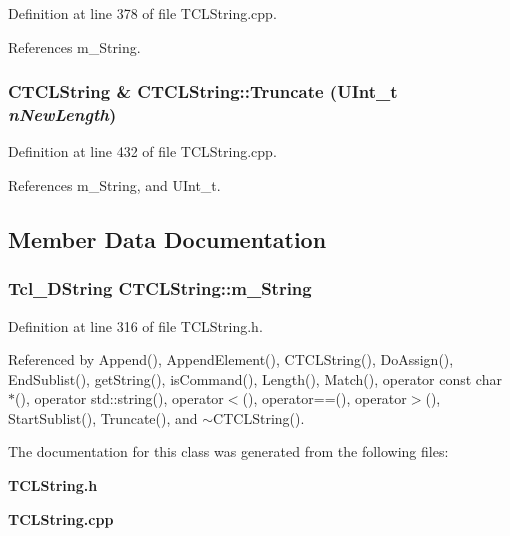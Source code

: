 Definition at line 378 of file TCLString.cpp.

References m\_\-String.
\subsubsection{\setlength{\rightskip}{0pt plus 5cm}CTCLString \& CTCLString::Truncate ({\bf UInt\_\-t} {\em n\-New\-Length})}\label{classCTCLString_a26}




Definition at line 432 of file TCLString.cpp.

References m\_\-String, and UInt\_\-t.

\subsection{Member Data Documentation}
\subsubsection{\setlength{\rightskip}{0pt plus 5cm}Tcl\_\-DString CTCLString::m\_\-String\hspace{0.3cm}{\tt  [private]}}\label{classCTCLString_o0}




Definition at line 316 of file TCLString.h.

Referenced by Append(), Append\-Element(), CTCLString(), Do\-Assign(), End\-Sublist(), get\-String(), is\-Command(), Length(), Match(), operator const char $\ast$(), operator std::string(), operator$<$(), operator==(), operator$>$(), Start\-Sublist(), Truncate(), and $\sim$CTCLString().

The documentation for this class was generated from the following files:\begin{CompactItemize}
\item 
{\bf TCLString.h}\item 
{\bf TCLString.cpp}\end{CompactItemize}
